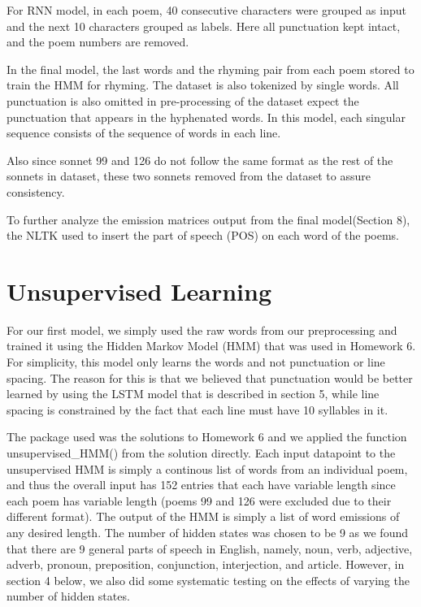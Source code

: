 For RNN model, in each poem, 40 consecutive characters were grouped as input and the next 10 characters grouped as labels. Here all punctuation kept intact, and the poem numbers are removed. 

In the final model, the last words and the rhyming pair from each poem stored to train the HMM for rhyming. The dataset is also tokenized by single words. All punctuation is also omitted in pre-processing of the dataset expect the punctuation that appears in the hyphenated words. In this model, each singular sequence consists of the sequence of words in each line.

Also since sonnet 99 and 126 do not follow the same format as the rest of the sonnets in dataset, these two sonnets removed from the dataset to assure consistency. 

To further analyze the emission matrices output from the final model(Section 8), the NLTK used to insert the part of speech (POS) on each word of the poems. 


\section{Unsupervised Learning}
For our first model, we simply used the raw words from our preprocessing and trained it using the Hidden Markov Model (HMM) that was used in Homework 6. For simplicity, this model only learns the words and not punctuation or line spacing. The reason for this is that we believed that punctuation would be better learned by using the LSTM model that is described in section 5, while line spacing is constrained by the fact that each line must have 10 syllables in it. 

The package used was the solutions to Homework 6 and we applied the function unsupervised_HMM() from the solution directly. Each input datapoint to the unsupervised HMM is simply a continous list of words from an individual poem, and thus the overall input has 152 entries that each have variable length since each poem has variable length (poems 99 and 126 were excluded due to their different format). The output of the HMM is simply a list of word emissions of any desired length. The number of hidden states was chosen to be 9 as we found that there are 9 general parts of speech in English, namely, noun, verb, adjective, adverb, pronoun, preposition, conjunction, interjection, and article. However, in section 4 below, we also did some systematic testing on the effects of varying the number of hidden states.

